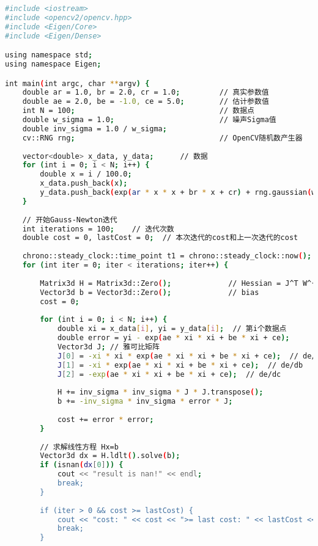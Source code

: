 \begin{lstlisting}[language=sh,caption=slambook2/ch6/gaussNewton.cpp]
#include <iostream>
#include <opencv2/opencv.hpp>
#include <Eigen/Core>
#include <Eigen/Dense>

using namespace std;
using namespace Eigen;

int main(int argc, char **argv) {
    double ar = 1.0, br = 2.0, cr = 1.0;         // 真实参数值
    double ae = 2.0, be = -1.0, ce = 5.0;        // 估计参数值
    int N = 100;                                 // 数据点
    double w_sigma = 1.0;                        // 噪声Sigma值
    double inv_sigma = 1.0 / w_sigma;
    cv::RNG rng;                                 // OpenCV随机数产生器
    
    vector<double> x_data, y_data;      // 数据
    for (int i = 0; i < N; i++) {
        double x = i / 100.0;
        x_data.push_back(x);
        y_data.push_back(exp(ar * x * x + br * x + cr) + rng.gaussian(w_sigma * w_sigma));
    }
    
    // 开始Gauss-Newton迭代
    int iterations = 100;    // 迭代次数
    double cost = 0, lastCost = 0;  // 本次迭代的cost和上一次迭代的cost
    
    chrono::steady_clock::time_point t1 = chrono::steady_clock::now();
    for (int iter = 0; iter < iterations; iter++) {
        
        Matrix3d H = Matrix3d::Zero();             // Hessian = J^T W^{-1} J in Gauss-Newton
        Vector3d b = Vector3d::Zero();             // bias
        cost = 0;
        
        for (int i = 0; i < N; i++) {
            double xi = x_data[i], yi = y_data[i];  // 第i个数据点
            double error = yi - exp(ae * xi * xi + be * xi + ce);
            Vector3d J; // 雅可比矩阵
            J[0] = -xi * xi * exp(ae * xi * xi + be * xi + ce);  // de/da
            J[1] = -xi * exp(ae * xi * xi + be * xi + ce);  // de/db
            J[2] = -exp(ae * xi * xi + be * xi + ce);  // de/dc
            
            H += inv_sigma * inv_sigma * J * J.transpose();
            b += -inv_sigma * inv_sigma * error * J;
            
            cost += error * error;
        }
        
        // 求解线性方程 Hx=b
        Vector3d dx = H.ldlt().solve(b);
        if (isnan(dx[0])) {
            cout << "result is nan!" << endl;
            break;
        }
        
        if (iter > 0 && cost >= lastCost) {
            cout << "cost: " << cost << ">= last cost: " << lastCost << ", break." << endl;
            break;
        }
        

\end{lstlisting}
